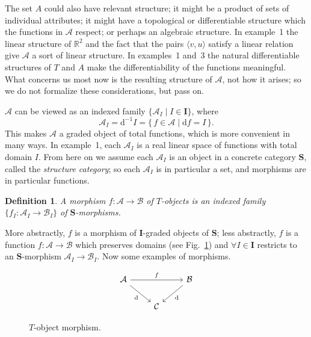 \documentclass[10pt,a4paper,twocolumn]{article}
\newtheorem*{definition*}{Definition}
\newcommand{\A}{\mathcal{A}}          %
\newcommand{\B}{\mathcal{B}}         %
\newcommand{\C}{\mathcal{C}}         %
\newcommand{\Scat}{\mathbf{S}}          %
\newcommand{\Iset}{\mathbf{I}}          %
\newcommand{\R}{\mathbb{R}}
\newcommand{\dom}{\mathrm{d}}            %
\begin{document}
The set $A$ could also have relevant structure; it might be a product of sets of individual attributes; it might have a topological or differentiable structure which the functions in $\A$ respect; or perhaps an algebraic structure.
In example~1 the linear structure of $\R^{2}$ and the fact that the pairs $\langle v,u\rangle$ satisfy a linear relation give $\A$ a sort of linear structure.
In examples~1 and~3 the natural differentiable structures of $T$ and $A$ make the differentiability of the functions meaningful.
What concerns us most now is the resulting structure of $\A$, not how it arises; so we do not formalize these considerations, but pass on.

$\A$ can be viewed as an indexed family $\{\A_{I}\mid I\in\Iset\}$,
where
\begin{equation*}
  \A_{I} = \dom^{-1}I = \{\,f\in\A \mid \dom f = I\,\}.
\end{equation*}
This makes $\A$ a graded object of total functions, which is more convenient in many ways.
In example~1, each $\A_{I}$ is a real linear space of functions with total domain $I$.
From here on we assume each $\A_{I}$ is an object in a concrete category $\Scat$, called the
\emph{structure category}; so each $\A_{I}$ is in particular a set, and morphisms are in particular functions.

\begin{definition*}
	A \emph{morphism} $f\colon \A\to\B$ of $T$-objects is an indexed family $\{f_{I}\colon \A_{I}\to\B_{I}\}$ of $\Scat$-morphisms.
\end{definition*}

More abstractly, $f$ is a morphism of $\Iset$-graded objects of $\Scat$; less abstractly, $f$ is a function $f\colon \A\to\B$ which preserves domains (see Fig.~\ref{fig:tobj-morphism}) and $\forall I\in\Iset$ restricts to an $\Scat$-morphism $\A_{I}\to\B_{I}$.
Now some examples of morphisms.

\begin{figure}
	\begin{equation*}
		\begin{tikzcd}
			\A && \B \\
			& \C
			\arrow["f", from=1-1, to=1-3]
			\arrow["\dom"', from=1-1, to=2-2]
			\arrow["\dom", from=1-3, to=2-2]
		\end{tikzcd}
	\end{equation*}
	\caption{\footnotesize $T$-object morphism.}%
	\label{fig:tobj-morphism}%
\end{figure}
\end{document}
